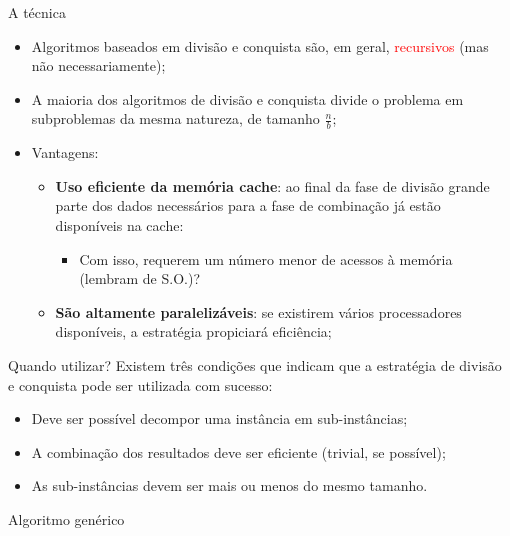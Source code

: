 \documentclass{beamer}
\newcommand{\tcr}[1]{\textcolor{red}{#1}}
\begin{document}
	\begin{frame}[c]{A técnica}
		\begin{itemize}
			\item Algoritmos baseados em divisão e conquista são, em geral, \tcr{recursivos} (mas não necessariamente);
			\item A maioria dos algoritmos de divisão e conquista divide o problema em subproblemas da mesma natureza, de tamanho $\displaystyle \frac{n}{b}$;
			\item Vantagens:
			\begin{itemize}
				\item \textbf{Uso eficiente da memória cache}: ao final da fase de divisão grande parte dos dados necessários para a fase de combinação já estão disponíveis na cache:
				\begin{itemize}
					\item Com isso, requerem um número menor de acessos à memória (lembram de S.O.)?
				\end{itemize}
			\item \textbf{São altamente paralelizáveis}: se existirem vários processadores disponíveis, a estratégia propiciará eficiência;
			\end{itemize}
		\end{itemize}
	\end{frame}

	\begin{frame}[c]{Quando utilizar?}
		Existem três condições que indicam que a estratégia de divisão e conquista pode ser utilizada com sucesso:
		\begin{itemize}
			\justifying
			\item Deve ser possível decompor uma instância em sub-instâncias;
			\item A combinação dos resultados deve ser eficiente (trivial, se possível);
			\item As sub-instâncias devem ser mais ou menos do mesmo tamanho.
		\end{itemize}
	\end{frame}

	\begin{frame}[c,fragile]{Algoritmo genérico}
		\begin{algorithm}[H]
			\small
		\end{algorithm}
	\end{frame}
\end{document}
